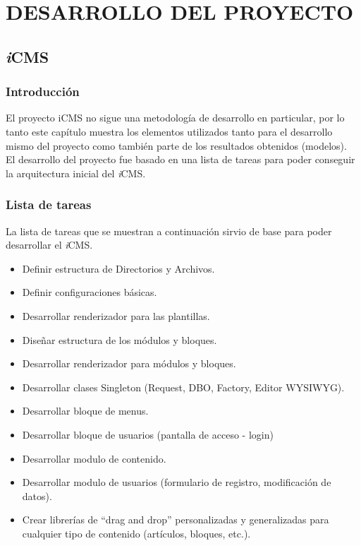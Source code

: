 \part{DESARROLLO DEL PROYECTO}

\chapter{\textit{i}CMS}
\newpage
\section{Introducci\'on}
El proyecto iCMS no sigue una metodolog\'ia de desarrollo en particular, por lo tanto este cap\'itulo muestra los elementos utilizados tanto para el desarrollo mismo del proyecto como tambi\'en parte de los resultados obtenidos (modelos).\\

El desarrollo del proyecto fue basado en una lista de tareas para poder conseguir la arquitectura inicial del \textit{i}CMS.\\

\section{Lista de tareas}
La lista de tareas que se muestran a continuaci\'on sirvio de base para poder desarrollar el \textit{i}CMS.

\begin{itemize}
\item Definir estructura de Directorios y Archivos.
\item Definir configuraciones b\'asicas.
\item Desarrollar renderizador para las plantillas.
\item Dise\~nar estructura de los m\'odulos y bloques.
\item Desarrollar renderizador para m\'odulos y bloques.
\item Desarrollar clases Singleton (Request, DBO, Factory, Editor WYSIWYG).
\item Desarrollar bloque de menus.
\item Desarrollar bloque de usuarios (pantalla de acceso - login)
\item Desarrollar modulo de contenido.
\item Desarrollar modulo de usuarios (formulario de registro, modificación de datos).
\item Crear librerías de ``drag and drop'' personalizadas y generalizadas para cualquier tipo de contenido (artículos, bloques, etc.).
\end{itemize}

